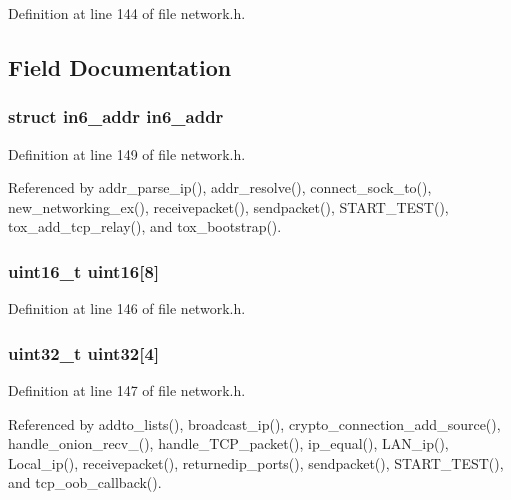 Definition at line 144 of file network.\+h.



\subsection{Field Documentation}
\hypertarget{union_i_p6_ac312c20ade57f180c50585e9ea42314c}{
\subsubsection[{in6\+\_\+addr}]{\setlength{\rightskip}{0pt plus 5cm}struct in6\+\_\+addr in6\+\_\+addr}}\label{union_i_p6_ac312c20ade57f180c50585e9ea42314c}


Definition at line 149 of file network.\+h.



Referenced by addr\+\_\+parse\+\_\+ip(), addr\+\_\+resolve(), connect\+\_\+sock\+\_\+to(), new\+\_\+networking\+\_\+ex(), receivepacket(), sendpacket(), S\+T\+A\+R\+T\+\_\+\+T\+E\+S\+T(), tox\+\_\+add\+\_\+tcp\+\_\+relay(), and tox\+\_\+bootstrap().

\hypertarget{union_i_p6_af0f89d2fc8c3ccbcc4fca0156563fcfe}{
\subsubsection[{uint16}]{\setlength{\rightskip}{0pt plus 5cm}uint16\+\_\+t uint16\mbox{[}8\mbox{]}}}\label{union_i_p6_af0f89d2fc8c3ccbcc4fca0156563fcfe}


Definition at line 146 of file network.\+h.

\hypertarget{union_i_p6_a1d8ab1f6c1da5565bed41e7095610dea}{
\subsubsection[{uint32}]{\setlength{\rightskip}{0pt plus 5cm}uint32\+\_\+t uint32\mbox{[}4\mbox{]}}}\label{union_i_p6_a1d8ab1f6c1da5565bed41e7095610dea}


Definition at line 147 of file network.\+h.



Referenced by addto\+\_\+lists(), broadcast\+\_\+ip(), crypto\+\_\+connection\+\_\+add\+\_\+source(), handle\+\_\+onion\+\_\+recv\+\_(), handle\+\_\+\+T\+C\+P\+\_\+packet(), ip\+\_\+equal(), L\+A\+N\+\_\+ip(), Local\+\_\+ip(), receivepacket(), returnedip\+\_\+ports(), sendpacket(), S\+T\+A\+R\+T\+\_\+\+T\+E\+S\+T(), and tcp\+\_\+oob\+\_\+callback().

